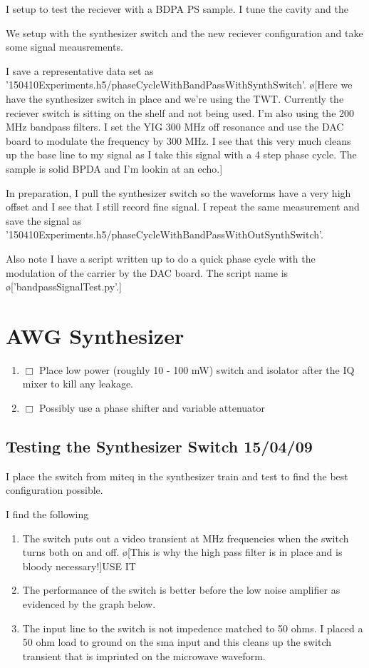 \documentclass[10pt]{book}
\begin{document}
I setup to test the reciever with a BDPA PS sample. I tune the cavity and the

We setup with the synthesizer switch and the new reciever configuration and take some signal meausrements.


I save a representative data set as '150410Experiments.h5/phaseCycleWithBandPassWithSynthSwitch'. \o[Here we have the synthesizer switch in place and we're using the TWT. Currently the reciever switch is sitting on the shelf and not being used. I'm also using the 200 MHz bandpass filters. I set the YIG 300 MHz off resonance and use the DAC board to modulate the frequency by 300 MHz. I see that this very much cleans up the base line to my signal as I take this signal with a 4 step phase cycle. The sample is solid BPDA and I'm lookin at an echo.]{}

In preparation, I pull the synthesizer switch so the waveforms have a very high offset and I see that I still record fine signal. I repeat the same measurement and save the signal as '150410Experiments.h5/phaseCycleWithBandPassWithOutSynthSwitch'.

Also note I have a script written up to do a quick phase cycle with the modulation of the carrier by the DAC board. The script name is \o['bandpassSignalTest.py'.]{}

\section{AWG Synthesizer}
\begin{enumerate}
	\item $\Box$ Place low power (roughly 10 - 100 mW) switch and isolator after the IQ mixer to kill any leakage.
	\item $\Box$ Possibly use a phase shifter and variable attenuator 
\end{enumerate}

\subsection{Testing the Synthesizer Switch 15/04/09}

I place the switch from miteq in the synthesizer train and test to find the best configuration possible.

I find the following 
\begin{enumerate}
    \item The switch puts out a video transient at MHz frequencies when the switch turns both on and off. \o[This is why the high pass filter is in place and is bloody necessary!]{USE IT}
    \item The performance of the switch is better before the low noise amplifier as evidenced by the graph below.
    \item The input line to the switch is not impedence matched to 50 ohms. I placed a 50 ohm load to ground on the sma input and this cleans up the switch transient that is imprinted on the microwave waveform.
\end{enumerate}
\end{document}
